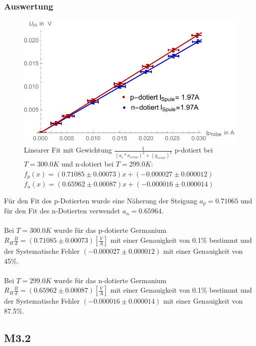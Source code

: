\subsubsection{Auswertung}
\begin{figure}[H]
	\centering
\includegraphics[width=0.9\linewidth]{IMAGE/M31_Fit.pdf}
	\caption{Linearer Fit mit Gewichtung $\frac{1}{(a_{i}*x_{error})^2+(y_{error})^2}$ p-dotiert bei $T=300.0K$ und n-dotiert bei $T=299.0K$:\\ $f_{p}(x)=(0.71085 \pm 0.00073)x + (-0.000027 \pm 0.000012)$\\ $f_{n}(x)=(0.65962 \pm 0.00087)x + (-0.000016 \pm 0.000014)$}
	\label{fig:M3_1_1}
\end{figure} 


Für den Fit  des p-Dotierten wurde eine Näherung der Steigung  $a_{p}=0.71065$  und für den Fit des n-Dotierten verwendet $a_{n}=0.65964$.\\
\\
Bei $T=300.0K$ wurde für das p-dotierte Germanium  $R_{H}\frac{B}{d}=(0.71085 \pm 0.00073) [\frac{V}{A}]$ mit einer Genauigkeit von 0.1\% bestimmt und\\
der Systematische Fehler $(-0.000027 \pm 0.000012)$ mit einer Genauigkeit von 45\%.\\
\\
Bei $T=299.0K$ wurde für das n-dotierte Germanium $R_{H}\frac{B}{d}=(0.65962 \pm 0.00087) [\frac{V}{A}]$ mit einer Genauigkeit von 0.1\% bestimmt und\\ der Systematische Fehler $(-0.000016 \pm 0.000014)$ mit einer Genauigkeit von 87.5\%.\\

\subsection{M3.2}
